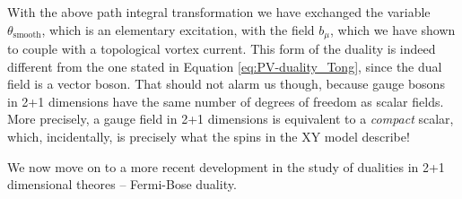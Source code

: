  With the above path integral transformation we have exchanged the variable $\theta_{\text{smooth}}$, which is an elementary excitation, with the field $b_{\mu}$, which we have shown to couple with a topological vortex current. This form of the duality is indeed different from the one stated in Equation \eqref{eq:PV-duality_Tong}, since the dual field is a vector boson. That should not alarm us though, because gauge bosons in 2+1 dimensions have the same number of degrees of freedom as scalar fields. More precisely, a gauge field in 2+1 dimensions is equivalent to a \textit{compact} scalar, which, incidentally, is precisely what the spins in the XY model describe!

 We now move on to a more recent development in the study of dualities in 2+1 dimensional theores -- Fermi-Bose duality.
%

